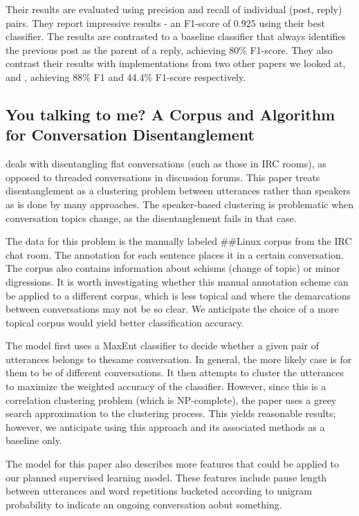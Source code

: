 \documentclass{article}
\begin{document}
Their results are evaluated using precision and recall of individual
(post, reply) pairs. They report impressive results - an F1-score of 0.925 using their best
classifier. The results are contrasted to a baseline classifier that always
identifies the previous post as the parent of a reply, achieving 80\% F1-score. 
They also contrast their results with implementations from two other papers we looked at,
\cite{Elsner2008a} and \cite{Wang2008a}, achieving 88\% F1 and 44.4\% F1-score
respectively.

\subsection{You talking to me? A Corpus and Algorithm for Conversation
Disentanglement}
\cite{Elsner2008a} deals with disentangling flat conversations (such as those
in IRC rooms), as opposed to threaded conversations in discussion forums. This
paper treats disentanglement as a clustering problem between utterances rather
than speakers as is done by many approaches. The speaker-based clustering is
problematic when conversation topics change, as the disentanglement fails in
that case.

The data for this problem is the manually labeled \#\#Linux corpus from the
IRC chat room. The annotation for each sentence places it in a certain
conversation. The corpus also contains information about schisms (change of
topic) or minor digressions. It is worth investigating whether this manual
annotation scheme can be applied to a different corpus, which is less topical
and where the demarcations between conversations may not be so clear. We
anticipate the choice of a more topical corpus would yield better
classification accuracy.

The model first uses a MaxEnt classifier to decide whether a given pair of
utterances belongs to thesame conversation. In general, the more likely case
is for them to be of different conversations. It then attempts to cluster the
utterances to maximize the weighted accuracy of the classifier. However, since
this is a correlation clustering problem (which is NP-complete), the paper
uses a greey search approximation to the clustering process. This yields
reasonable results; however, we anticipate using this approach and its
associated methods as a baseline only.

The model for this paper also describes more features that could be applied to
our planned supervised learning model. These features include pause length
between utterances and word repetitions bucketed according to unigram
probability to indicate an ongoing conversation aobut something.
\end{document}
